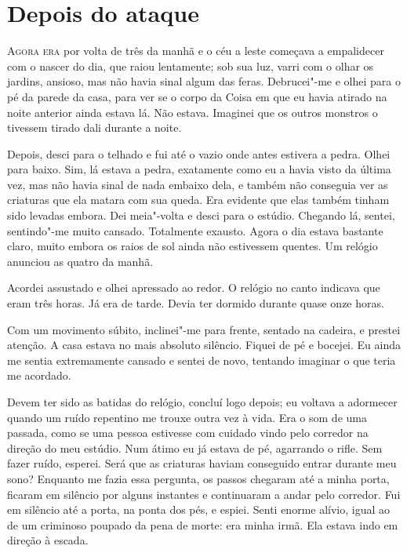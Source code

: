 \clearpage

\chapter{Depois do ataque}

\textsc{Agora era} por volta de três da manhã e o céu a leste começava a empalidecer com o nascer do dia, que raiou
lentamente; sob sua luz, varri com o olhar os jardins, ansioso, mas não havia sinal algum das feras. Debrucei"-me e
olhei para o pé da parede da casa, para ver se o corpo da Coisa em que eu havia atirado na noite anterior ainda estava
lá. Não estava. Imaginei que os outros monstros o tivessem tirado dali durante a noite.

Depois, desci para o telhado e fui até o vazio onde antes estivera a pedra. Olhei para baixo. Sim, lá estava a pedra,
exatamente como eu a havia visto da última vez, mas não havia sinal de nada embaixo dela, e também não conseguia ver as
criaturas que ela matara com sua queda. Era evidente que elas também tinham sido levadas embora. Dei meia"-volta e desci para o
estúdio. Chegando lá, sentei, sentindo"-me muito cansado. Totalmente exausto. Agora o dia estava bastante claro, muito
embora os raios de sol ainda não estivessem quentes. Um relógio anunciou as quatro da manhã.

Acordei assustado e olhei apressado ao redor. O relógio no canto indicava que eram três horas. Já era de tarde. Devia
ter dormido durante quase onze horas.

Com um movimento súbito, inclinei"-me para frente, sentado na cadeira, e prestei atenção. A casa estava no mais absoluto
silêncio. Fiquei de pé e bocejei. Eu ainda me sentia extremamente cansado e sentei de novo, tentando imaginar o que
teria me acordado.

Devem ter sido as batidas do relógio, concluí logo depois; eu voltava a adormecer quando um ruído repentino me trouxe outra
vez à vida. Era o som de uma passada, como se uma pessoa estivesse com cuidado vindo pelo corredor na direção do
meu estúdio. Num átimo eu já estava de pé, agarrando o rifle. Sem fazer ruído, esperei. Será que as criaturas haviam
conseguido entrar durante meu sono? Enquanto me fazia essa pergunta, os passos chegaram até a minha porta, ficaram em
silêncio por alguns instantes e continuaram a andar pelo corredor. Fui em silêncio até a porta, na ponta dos
pés, e espiei. Senti enorme alívio, igual ao de um criminoso poupado da pena de morte: era minha irmã. Ela estava indo
em direção à escada.

